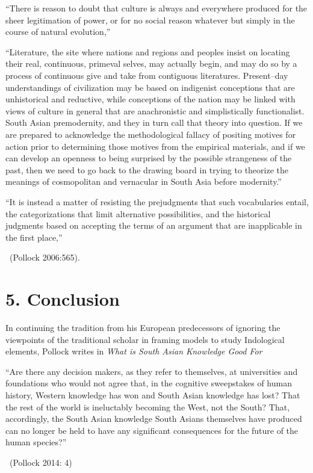 “There is reason to doubt that culture is always and everywhere produced for the sheer legitimation of power, or for no social reason whatever but simply in the course of natural evolution,”

“Literature, the site where nations and regions and peoples insist on locating their real, continuous, primeval selves, may actually begin, and may do so by a process of continuous give and take from contiguous literatures. Present–day understandings of civilization may be based on indigenist conceptions that are unhistorical and reductive, while conceptions of the nation may be linked with views of culture in general that are anachronistic and simplistically functionalist. South Asian premodernity, and they in turn call that theory into question. If we are prepared to acknowledge the methodological fallacy of positing motives for action prior to determining those motives from the empirical materials, and if we can develop an openness to being surprised by the possible strangeness of the past, then we need to go back to the drawing board in trying to theorize the meanings of cosmopolitan and vernacular in South Asia before modernity.”

\begin{myquote}
“It is instead a matter of resisting the prejudgments that such vocabularies entail, the categorizations that limit alternative possibilities, and the historical judgments based on accepting the terms of an argument that are inapplicable in the first place,” 

~\hfill (Pollock 2006:565).
\end{myquote}


\section*{5. Conclusion}

In continuing the tradition from his European predecessors of ignoring the viewpoints of the traditional scholar in framing models to study Indological elements, Pollock writes in \textit{What is South Asian Knowledge Good For}

\begin{myquote}
“Are there any decision makers, as they refer to themselves, at universities and foundations who would not agree that, in the cognitive sweepstakes of human history, Western knowledge has won and South Asian knowledge has lost? That the rest of the world is ineluctably becoming the West, not the South? That, accordingly, the South Asian knowledge South Asians themselves have produced can no longer be held to have any significant consequences for the future of the human species?” 

~\hfill (Pollock 2014: 4)
\end{myquote}

